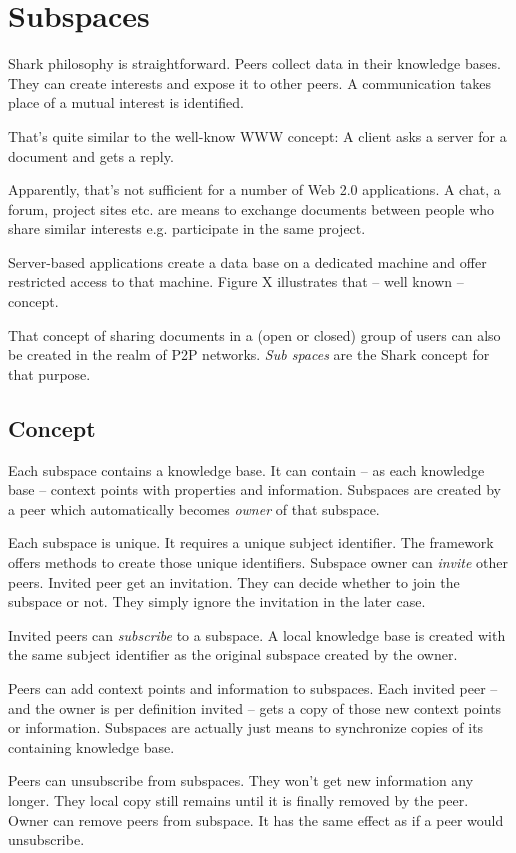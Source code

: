 \chapter{Subspaces}
Shark philosophy is straightforward. Peers collect data in their
knowledge bases. They can create interests and expose it to other 
peers. A communication takes place of a mutual interest is identified.

That's quite similar to the well-know WWW concept: A client asks a 
server for a document and gets a reply.

Apparently, that's not sufficient for a number of Web 2.0 applications.
A chat, a forum, project sites etc. are means to exchange documents 
between people who share similar interests e.g. participate in the same
project.

Server-based applications create a data base on a dedicated machine
and offer restricted access to that machine. Figure X illustrates that
-- well known -- concept.

That concept of sharing documents in a (open or closed) group 
of users can also be created in the realm of P2P networks. 
{\it Sub spaces} are the Shark concept for that purpose.

\section{Concept}
Each subspace contains a knowledge base. It can contain -- as each knowledge base -- context points with properties and information. Subspaces are created by a peer which automatically becomes {\it owner} of that subspace. 

Each subspace is unique. It requires a unique subject identifier. The framework offers methods to create those unique identifiers. Subspace owner can {\it invite} other peers. Invited peer get an invitation. They can decide whether to join the subspace or not. They simply ignore the invitation in the later case.

Invited peers can {\it subscribe} to a subspace. A local knowledge base is created with the same subject identifier as the original subspace created by
the owner. 

Peers can add context points and information to subspaces. Each invited peer -- and the owner is per definition invited -- gets a copy of those new context points or information. Subspaces are actually just means to synchronize copies of its containing knowledge base.

Peers can unsubscribe from subspaces. They won't get new information any longer. They local copy still remains until it is finally removed by the peer. Owner can remove peers from subspace. It has the same effect as if a peer 
would unsubscribe.

